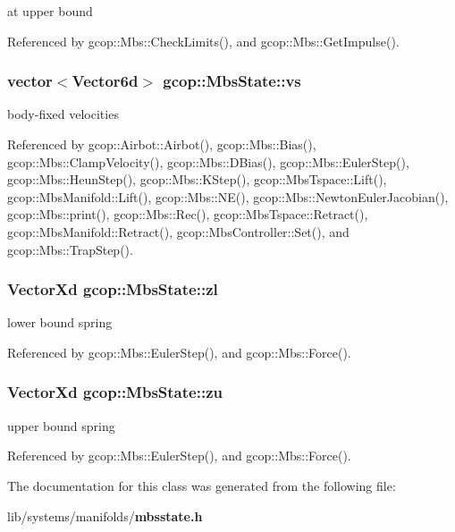 at upper bound 



\-Referenced by gcop\-::\-Mbs\-::\-Check\-Limits(), and gcop\-::\-Mbs\-::\-Get\-Impulse().

\subsubsection[{vs}]{\setlength{\rightskip}{0pt plus 5cm}vector$<${\bf \-Vector6d}$>$ {\bf gcop\-::\-Mbs\-State\-::vs}}\label{classgcop_1_1MbsState_afaadf53c908e2ad6e0e0fe4fec79c4ec}


body-\/fixed velocities 



\-Referenced by gcop\-::\-Airbot\-::\-Airbot(), gcop\-::\-Mbs\-::\-Bias(), gcop\-::\-Mbs\-::\-Clamp\-Velocity(), gcop\-::\-Mbs\-::\-D\-Bias(), gcop\-::\-Mbs\-::\-Euler\-Step(), gcop\-::\-Mbs\-::\-Heun\-Step(), gcop\-::\-Mbs\-::\-K\-Step(), gcop\-::\-Mbs\-Tspace\-::\-Lift(), gcop\-::\-Mbs\-Manifold\-::\-Lift(), gcop\-::\-Mbs\-::\-N\-E(), gcop\-::\-Mbs\-::\-Newton\-Euler\-Jacobian(), gcop\-::\-Mbs\-::print(), gcop\-::\-Mbs\-::\-Rec(), gcop\-::\-Mbs\-Tspace\-::\-Retract(), gcop\-::\-Mbs\-Manifold\-::\-Retract(), gcop\-::\-Mbs\-Controller\-::\-Set(), and gcop\-::\-Mbs\-::\-Trap\-Step().

\subsubsection[{zl}]{\setlength{\rightskip}{0pt plus 5cm}\-Vector\-Xd {\bf gcop\-::\-Mbs\-State\-::zl}}\label{classgcop_1_1MbsState_a04fd076bd1a11c94830e4b7ed2cd3eca}


lower bound spring 



\-Referenced by gcop\-::\-Mbs\-::\-Euler\-Step(), and gcop\-::\-Mbs\-::\-Force().

\subsubsection[{zu}]{\setlength{\rightskip}{0pt plus 5cm}\-Vector\-Xd {\bf gcop\-::\-Mbs\-State\-::zu}}\label{classgcop_1_1MbsState_a30bdc8fe0011e5a827c54ce3aa3aee66}


upper bound spring 



\-Referenced by gcop\-::\-Mbs\-::\-Euler\-Step(), and gcop\-::\-Mbs\-::\-Force().



\-The documentation for this class was generated from the following file\-:\begin{DoxyCompactItemize}
\item 
lib/systems/manifolds/{\bf mbsstate.\-h}\end{DoxyCompactItemize}
